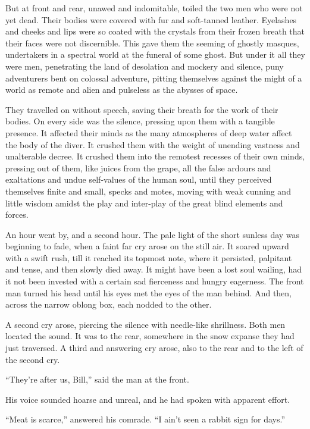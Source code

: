 But at front and rear, unawed and indomitable, toiled the two men who
were not yet dead. Their bodies were covered with fur and soft-tanned
leather. Eyelashes and cheeks and lips were so coated with the crystals
from their frozen breath that their faces were not discernible. This
gave them the seeming of ghostly masques, undertakers in a spectral
world at the funeral of some ghost. But under it all they were men,
penetrating the land of desolation and mockery and silence, puny
adventurers bent on colossal adventure, pitting themselves against the
might of a world as remote and alien and pulseless as the abysses of
space.

They travelled on without speech, saving their breath for the work of
their bodies. On every side was the silence, pressing upon them with a
tangible presence. It affected their minds as the many atmospheres of
deep water affect the body of the diver. It crushed them with the
weight of unending vastness and unalterable decree. It crushed them
into the remotest recesses of their own minds, pressing out of them,
like juices from the grape, all the false ardours and exaltations and
undue self-values of the human soul, until they perceived themselves
finite and small, specks and motes, moving with weak cunning and little
wisdom amidst the play and inter-play of the great blind elements and
forces.

An hour went by, and a second hour. The pale light of the short sunless
day was beginning to fade, when a faint far cry arose on the still air.
It soared upward with a swift rush, till it reached its topmost note,
where it persisted, palpitant and tense, and then slowly died away. It
might have been a lost soul wailing, had it not been invested with a
certain sad fierceness and hungry eagerness. The front man turned his
head until his eyes met the eyes of the man behind. And then, across
the narrow oblong box, each nodded to the other.

A second cry arose, piercing the silence with needle-like shrillness.
Both men located the sound. It was to the rear, somewhere in the snow
expanse they had just traversed. A third and answering cry arose, also
to the rear and to the left of the second cry.

“They’re after us, Bill,” said the man at the front.

His voice sounded hoarse and unreal, and he had spoken with apparent
effort.

“Meat is scarce,” answered his comrade. “I ain’t seen a rabbit sign for
days.”

